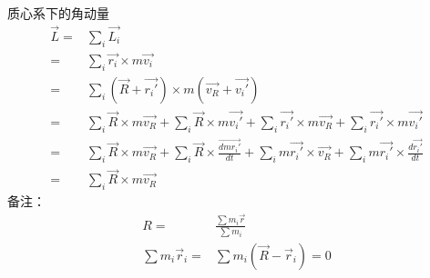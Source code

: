 \documentclass[UTF8,10pt]{article}
\begin{document}
质心系下的角动量
\begin{align*}
    \vec{L}= & \sum_i\vec{L_i}                                                                                               \\
    =        & \sum_i \vec{r_i}\times m\vec{v_i}                                                                             \\
    =        & \sum_i (\vec{R}+\vec{r_i'})\times m(\vec{v_R}+\vec{v_i'})                                                     \\
    =        & \sum_i\vec{R}\times m\vec{v_R}+\sum_i\vec{R}\times m\vec{v_i'}+\sum_i\vec{r_i'}\times m\vec{v_R}
    +\sum_i\vec{r_i'}\times m\vec{v_i'}                                                                                      \\
    =        & \sum_i\vec{R}\times m\vec{v_R}+\sum_i\vec{R}\times \frac{\vec{dm r_i'}}{dt}+\sum_im\vec{r_i'}\times \vec{v_R}
    +\sum_im\vec{r_i'}\times \frac{d\vec{r_i'}}{dt}                                                                          \\
    =        & \sum_i \vec{R}\times m\vec{v_R}
\end{align*}
备注：
\begin{align*}
    R=                      & \frac{\sum m_{i} \vec{r}}{\sum m_{i}}        \\
    \sum m_{i} \vec{r}_{i}= & \sum m_{i}\left(\vec{R}-\vec{r}_{i}\right)=0
\end{align*}
\end{document}
